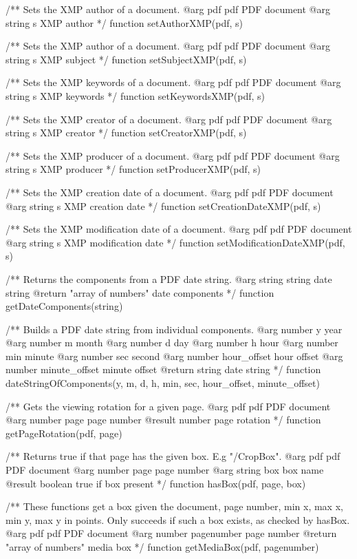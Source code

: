 /** Sets the XMP author of a document.
@arg {pdf} pdf PDF document
@arg {string} s XMP author */
function setAuthorXMP(pdf, s) {}

/** Sets the XMP author of a document.
@arg {pdf} pdf PDF document
@arg {string} s XMP subject */
function setSubjectXMP(pdf, s) {}

/** Sets the XMP keywords of a document.
@arg {pdf} pdf PDF document
@arg {string} s XMP keywords */
function setKeywordsXMP(pdf, s) {}

/** Sets the XMP creator of a document.
@arg {pdf} pdf PDF document
@arg {string} s XMP creator */
function setCreatorXMP(pdf, s) {}

/** Sets the XMP producer of a document.
@arg {pdf} pdf PDF document
@arg {string} s XMP producer */
function setProducerXMP(pdf, s) {}

/** Sets the XMP creation date of a document.
@arg {pdf} pdf PDF document
@arg {string} s XMP creation date */
function setCreationDateXMP(pdf, s) {}

/** Sets the XMP modification date of a document.
@arg {pdf} pdf PDF document
@arg {string} s XMP modification date */
function setModificationDateXMP(pdf, s) {}

/** Returns the components from a PDF date string.
@arg {string} string date string
@return {"array of numbers"} date components */
function getDateComponents(string) {}

/** Builds a PDF date string from individual components.
@arg {number} y year
@arg {number} m month
@arg {number} d day
@arg {number} h hour
@arg {number} min minute
@arg {number} sec second
@arg {number} hour_offset hour offset
@arg {number} minute_offset minute offset
@return {string} date string */
function dateStringOfComponents(y, m, d, h, min, sec, hour_offset, minute_offset) {}

/** Gets the viewing rotation for a given page.
@arg {pdf} pdf PDF document
@arg {number} page page number
@result {number} page rotation */
function getPageRotation(pdf, page) {}

/** Returns true if that page has the given box. E.g "/CropBox".
@arg {pdf} pdf PDF document
@arg {number} page page number
@arg {string} box box name
@result {boolean} true if box present */
function hasBox(pdf, page, box) {}

/** These functions get a box given the document, page number, min x, max x,
min y, max y in points. Only succeeds if such a box exists, as checked by
hasBox.
@arg {pdf} pdf PDF document
@arg {number} pagenumber page number
@return {"array of numbers"} media box */
function getMediaBox(pdf, pagenumber) {}

